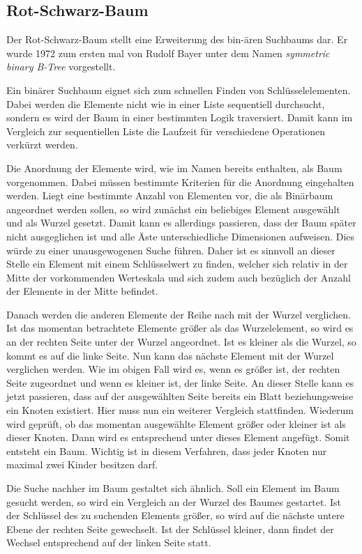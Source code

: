 \subsection{Rot-Schwarz-Baum}\label{s:rb_tree}
Der Rot-Schwarz-Baum stellt eine Erweiterung des bin-ären Suchbaums dar. Er wurde 1972 zum ersten mal von Rudolf Bayer unter dem Namen  \textit{symmetric binary B-Tree} vorgestellt.

Ein binärer Suchbaum eignet sich zum schnellen Finden von Schlüsselelementen. Dabei werden die Elemente nicht wie in einer Liste sequentiell durchsucht, sondern es wird der Baum in einer bestimmten Logik traversiert.
Damit kann im Vergleich zur sequentiellen Liste die Laufzeit für verschiedene Operationen verkürzt werden.

Die Anordnung der Elemente wird, wie im Namen bereits enthalten, als Baum vorgenommen. Dabei müssen bestimmte Kriterien für die Anordnung eingehalten werden. Liegt eine bestimmte Anzahl von Elementen vor, die als Binärbaum angeordnet werden sollen, so wird zunächst ein beliebiges Element ausgewählt und als Wurzel gesetzt. Damit kann es allerdings passieren, dass der Baum später nicht ausgeglichen ist und alle Äste unterschiedliche Dimensionen aufweisen. Dies würde zu einer unausgewogenen Suche führen. Daher ist es sinnvoll an dieser Stelle ein Element mit einem Schlüsselwert zu finden, welcher sich relativ in der Mitte der vorkommenden Werteskala und sich zudem auch bezüglich der Anzahl der Elemente in der Mitte befindet.

Danach werden die anderen Elemente der Reihe nach mit der Wurzel verglichen. Ist das momentan betrachtete Elemente größer als das Wurzelelement, so wird es an der rechten Seite unter der Wurzel angeordnet. Ist es kleiner als die Wurzel, so kommt es auf die linke Seite. Nun kann das nächste Element mit der Wurzel verglichen werden. Wie im obigen Fall wird es, wenn es größer ist, der rechten Seite zugeordnet und wenn es kleiner ist, der linke Seite. An dieser Stelle kann es jetzt passieren, dass auf der ausgewählten Seite bereits ein Blatt beziehungsweise ein Knoten existiert. Hier muss nun ein weiterer Vergleich stattfinden. Wiederum wird geprüft, ob das momentan ausgewählte Element größer oder kleiner ist als dieser Knoten. Dann wird es entsprechend unter dieses Element angefügt. Somit entsteht ein Baum. Wichtig ist in diesem Verfahren, dass jeder Knoten nur maximal zwei Kinder besitzen darf. 

Die Suche nachher im Baum gestaltet sich ähnlich. Soll ein Element im Baum gesucht werden, so wird ein Vergleich an der Wurzel des Baumes gestartet. Ist der Schlüs\-sel des zu suchenden Elements größer, so wird auf die nächste untere Ebene der rechten Seite gewechselt. Ist der Schlüssel kleiner, dann findet der Wechsel entsprechend auf der linken Seite statt. 

